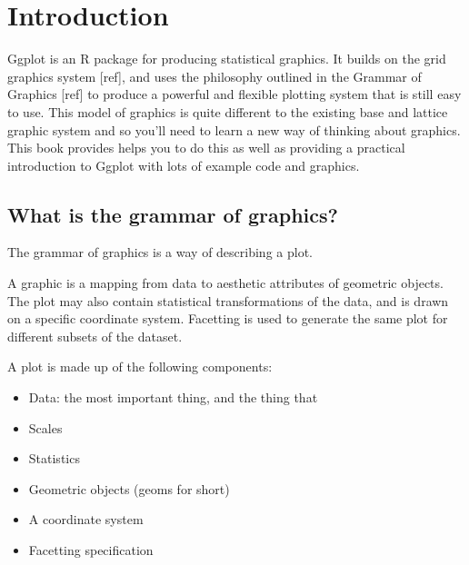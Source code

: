 



\chapter{Introduction}

Ggplot is an R package for producing statistical graphics.  It builds on the grid graphics system [ref], and uses the philosophy outlined in the Grammar of Graphics [ref] to produce a powerful and flexible plotting system that is still easy to use.  This model of graphics is quite different to the existing base and lattice graphic system and so you'll need to learn a new way of thinking about graphics.  This book provides helps you to do this as well as providing a practical introduction to Ggplot with lots of example code and graphics.

\section{What is the grammar of graphics?}

The grammar of graphics is a way of describing a plot.

A graphic is a mapping from data to aesthetic attributes of geometric objects.  The plot may also contain statistical transformations of the data, and is drawn on a specific coordinate system.  Facetting is used to generate the same plot for different subsets of the dataset.

A plot is made up of the following components:

\begin{itemize}
	\item Data: the most important thing, and the thing that 
	\item Scales
	\item Statistics
	\item Geometric objects (geoms for short)
	\item A coordinate system
	\item Facetting specification
\end{itemize}

